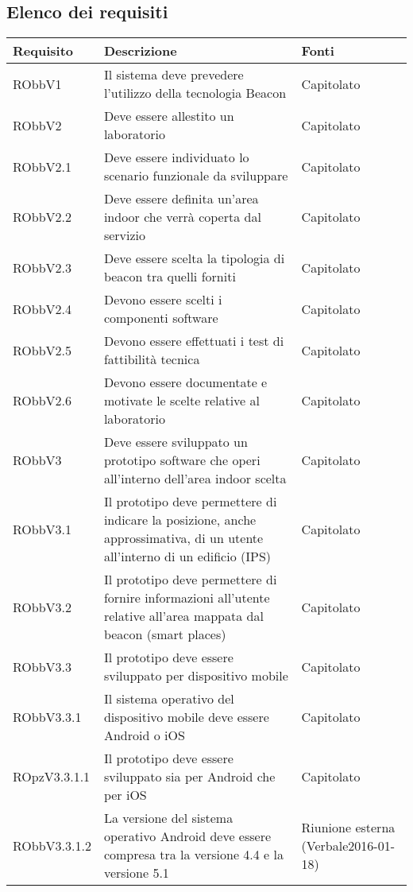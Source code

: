 \documentclass[../AnalisiDeiRequisiti.tex]{subfiles}
\begin{document}
	\subsection{Elenco dei requisiti}
	\begin{longtabu} to \textwidth {X X[2] X}
\toprule
\textbf{Requisito} & \textbf{Descrizione} & \textbf{Fonti}\\
\midrule
\endhead
{} 
RObbV1 & Il sistema deve prevedere l'utilizzo della tecnologia Beacon & Capitolato \\ 
\midrule 
RObbV2 & Deve essere allestito un laboratorio & Capitolato \\ 
\midrule 
RObbV2.1 & Deve essere individuato lo scenario funzionale da sviluppare & Capitolato \\ 
\midrule 
RObbV2.2 & Deve essere definita un'area indoor che verrà coperta dal servizio & Capitolato \\ 
\midrule 
RObbV2.3 & Deve essere scelta la tipologia di beacon tra quelli forniti & Capitolato \\ 
\midrule 
RObbV2.4 & Devono essere scelti i componenti software & Capitolato \\ 
\midrule 
RObbV2.5 & Devono essere effettuati i test di fattibilità tecnica & Capitolato \\ 
\midrule 
RObbV2.6 & Devono essere documentate e motivate le scelte relative al laboratorio & Capitolato \\ 
\midrule 
RObbV3 & Deve essere sviluppato un prototipo software che operi all'interno dell'area indoor scelta & Capitolato \\ 
\midrule 
RObbV3.1 & Il prototipo deve permettere di indicare la posizione, anche approssimativa, di un utente all'interno di un edificio (IPS) & Capitolato \\ 
\midrule 
RObbV3.2 & Il prototipo deve permettere di fornire informazioni all'utente relative all'area mappata dal beacon (smart places) & Capitolato \\ 
\midrule 
RObbV3.3 & Il prototipo deve essere sviluppato per dispositivo mobile & Capitolato \\ 
\midrule 
RObbV3.3.1 & Il sistema operativo del dispositivo mobile deve essere Android o iOS & Capitolato \\ 
\midrule 
ROpzV3.3.1.1 & Il prototipo deve essere sviluppato sia per Android che per iOS & Capitolato \\ 
\midrule 
RObbV3.3.1.2 & La versione del sistema operativo Android deve essere compresa tra la versione 4.4 e la versione 5.1 & Riunione esterna (Verbale2016-01-18) \\ 

\end{longtabu}
\end{document}

